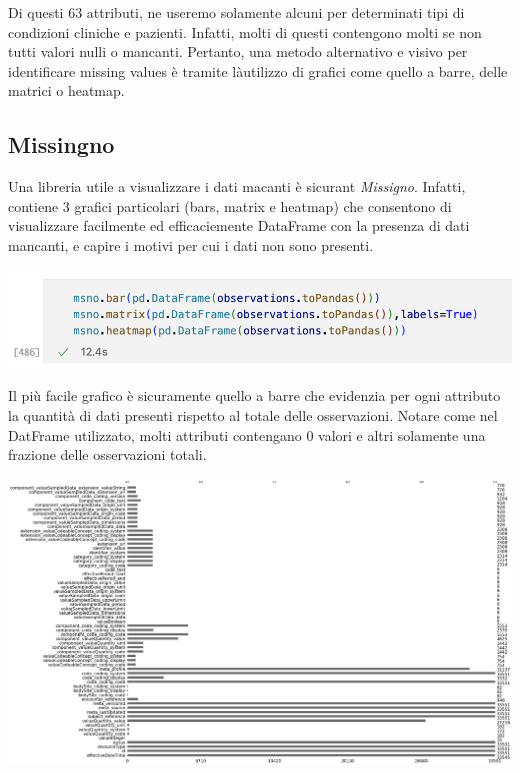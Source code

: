 \documentclass[11pt, oneside]{article}
\begin{document}
Di questi 63 attributi, ne useremo solamente alcuni per determinati tipi di condizioni cliniche e pazienti. Infatti, molti di questi contengono molti se non tutti valori nulli o mancanti. Pertanto, una metodo alternativo e visivo per identificare missing values è tramite làutilizzo di grafici come quello a barre, delle matrici o heatmap.

\subsection{Missingno}

Una libreria utile a visualizzare i dati macanti è sicurant \emph{Missigno}. Infatti, contiene 3 grafici particolari (bars, matrix e heatmap) che consentono di visualizzare facilmente ed efficaciemente DataFrame con la presenza di dati mancanti, e capire i motivi per cui i dati non sono presenti.

\begin{center}
\includegraphics[scale=0.45]{2_msn.png}
\end{center}

Il più facile grafico è sicuramente quello a barre che evidenzia per ogni attributo la quantità di dati presenti rispetto al totale delle osservazioni. Notare come nel DatFrame utilizzato, molti attributi contengano 0 valori e altri solamente una frazione delle osservazioni totali. 

\begin{center}
\includegraphics[scale=0.2]{2_msn_bars.png}
\end{center}
\end{document}
